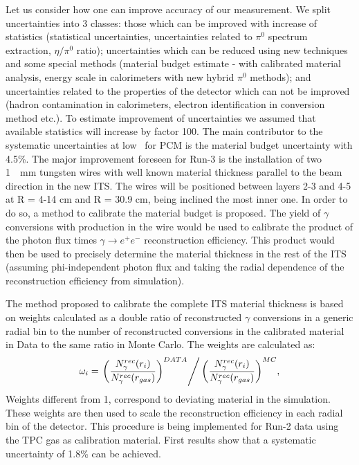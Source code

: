 Let us consider how one can improve accuracy of our measurement. We split uncertainties into 3 classes: those which can be improved with increase of statistics (statistical uncertainties, uncertainties related to $\pi^0$ spectrum extraction, $\eta/\pi^0$ ratio); uncertainties which can be reduced using new techniques and some special methods (material budget estimate - with calibrated material analysis, energy scale in calorimeters with new hybrid $\pi^0$ methods); and uncertainties related to the properties of the detector which can not be improved (hadron contamination in calorimeters, electron identification in conversion method etc.). To estimate improvement of uncertainties we assumed that available statistics will increase by factor 100. 
The main contributor to the systematic uncertainties at 
low \pT\  for PCM is the material budget uncertainty with 4.5\%. 
The major improvement foreseen for Run-3 is the installation of two 1~\ mm tungsten wires with well known material thickness parallel to the beam direction in the new ITS. The wires will be positioned 
between layers 2-3 and 4-5 at R = 4-14 cm and R = 30.9 cm, being inclined the most inner one. 
In order to do so, a method to calibrate the material budget is proposed. 
The yield of $\gamma$ conversions with production in the wire would be used to calibrate the product 
of the photon flux times $\gamma \rightarrow e^+e^-$  reconstruction efficiency.
This product would then be used to precisely determine the material thickness in the rest of the ITS (assuming phi-independent photon flux and taking the radial dependence of the reconstruction efficiency from simulation).


The method proposed to calibrate the complete ITS material thickness is based on weights calculated as  a double ratio of reconstructed  $\gamma$ conversions in a generic radial bin to the number of reconstructed conversions in the calibrated material in Data to the same ratio in Monte Carlo. 
The weights are calculated as: 
\begin{equation}
\omega_i= \left .{\left(\frac{N_\gamma^{rec}(r_i)}{N_\gamma^{rec}(r_{gas})}\right)^{DATA}} \right /{\left(\frac{N_\gamma^{rec}(r_i)}{N_\gamma^{rec}(r_{gas})}\right)^{MC}} ,
\end{equation}
Weights different from 1, correspond to deviating material in the simulation.
These weights are then used to scale the reconstruction efficiency in each radial bin of the detector.
This procedure is being implemented for Run-2 data using the TPC gas as calibration material. First results
show that a systematic uncertainty of 1.8\% can be achieved.

